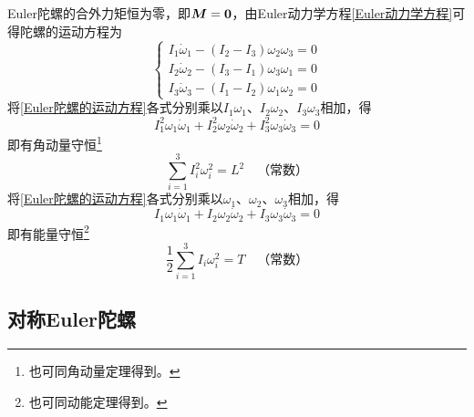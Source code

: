 Euler陀螺的合外力矩恒为零，即$\boldsymbol{M} = \boldsymbol{0}$，由Euler动力学方程\eqref{Euler动力学方程}可得陀螺的运动方程为
\begin{equation}
	\begin{cases}
		I_1 \dot{\omega}_1 - (I_2-I_3)\omega_2 \omega_3 = 0 \\
		I_2 \dot{\omega}_2 - (I_3-I_1)\omega_3 \omega_1 = 0 \\
		I_3 \dot{\omega}_3 - (I_1-I_2)\omega_1 \omega_2 = 0
	\end{cases}
	\label{Euler陀螺的运动方程}
\end{equation}
将\eqref{Euler陀螺的运动方程}各式分别乘以$I_1\omega_1$、$I_2\omega_2$、$I_3\omega_3$相加，得
\begin{equation*}
	I_1^2 \omega_1 \dot{\omega}_1 + I_2^2 \omega_2 \dot{\omega}_2 + I_3^2 \omega_3 \dot{\omega}_3 = 0
\end{equation*}
即有角动量守恒\footnote{也可同角动量定理得到。}
\begin{equation}
	\sum_{i=1}^3 I_i^2 \omega_i^2 = L^2 \quad\text{（常数）}
	\label{Euler陀螺角动量守恒}
\end{equation}
将\eqref{Euler陀螺的运动方程}各式分别乘以$\omega_1$、$\omega_2$、$\omega_3$相加，得
\begin{equation*}
	I_1 \omega_1 \dot{\omega}_1 + I_2 \omega_2 \dot{\omega}_2 + I_3 \omega_3 \dot{\omega}_3 = 0
\end{equation*}
即有能量守恒\footnote{也可同动能定理得到。}
\begin{equation}
	\frac12 \sum_{i=1}^3 I_i \omega_i^2 = T \quad\text{（常数）}
	\label{Euler陀螺能量守恒}
\end{equation}

\subsection{对称Euler陀螺}

